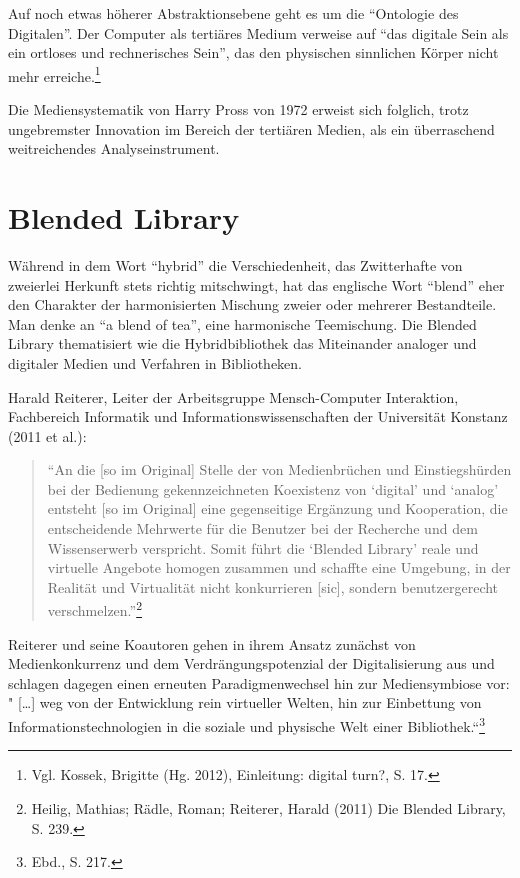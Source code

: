 \documentclass[a4paper,
fontsize=11pt,
oneside,
numbers=noperiodatend,
parskip=half-,
bibliography=totoc,
final
]{scrartcl}
\begin{document}
Auf noch etwas höherer Abstraktionsebene geht es um die
\enquote{Ontologie des Digitalen}. Der Computer als tertiäres Medium
verweise auf \enquote{das digitale Sein als ein ortloses und
rechnerisches Sein}, das den physischen sinnlichen Körper nicht mehr
erreiche.\footnote{Vgl. Kossek, Brigitte (Hg. 2012), Einleitung: digital
  turn?, S. 17.}

Die Mediensystematik von Harry Pross von 1972 erweist sich folglich,
trotz ungebremster Innovation im Bereich der tertiären Medien, als ein
überraschend weitreichendes Analyseinstrument.

\section*{Blended Library}\label{blended-library}

Während in dem Wort \enquote{hybrid} die Verschiedenheit, das
Zwitterhafte von zweierlei Herkunft stets richtig mitschwingt, hat das
englische Wort \enquote{blend} eher den Charakter der harmonisierten
Mischung zweier oder mehrerer Bestandteile. Man denke an \enquote{a
blend of tea}, eine harmonische Teemischung. Die Blended Library
thematisiert wie die Hybridbibliothek das Miteinander analoger und
digitaler Medien und Verfahren in Bibliotheken.

Harald Reiterer, Leiter der Arbeitsgruppe Mensch-Computer Interaktion,
Fachbereich Informatik und Informationswissenschaften der Universität
Konstanz (2011 et al.):

\begin{quote}
\enquote{An die {[}so im Original{]} Stelle der von Medienbrüchen und
Einstiegshürden bei der Bedienung gekennzeichneten Koexistenz von
\enquote{digital} und \enquote{analog} entsteht {[}so im Original{]}
eine gegenseitige Ergänzung und Kooperation, die entscheidende Mehrwerte
für die Benutzer bei der Recherche und dem Wissenserwerb verspricht.
Somit führt die \enquote{Blended Library} reale und virtuelle Angebote
homogen zusammen und schaffte eine Umgebung, in der Realität und
Virtualität nicht konkurrieren {[}sic{]}, sondern benutzergerecht
verschmelzen.}\footnote{Heilig, Mathias; Rädle, Roman; Reiterer, Harald
  (2011) Die Blended Library, S. 239.}
\end{quote}

Reiterer und seine Koautoren gehen in ihrem Ansatz zunächst von
Medienkonkurrenz und dem Verdrängungspotenzial der Digitalisierung aus
und schlagen dagegen einen erneuten Paradigmenwechsel hin zur
Mediensymbiose vor: " {[}\ldots{}{]} weg von der Entwicklung rein
virtueller Welten, hin zur Einbettung von Informationstechnologien in
die soziale und physische Welt einer Bibliothek.``\footnote{Ebd., S.
  217.}
\end{document}
